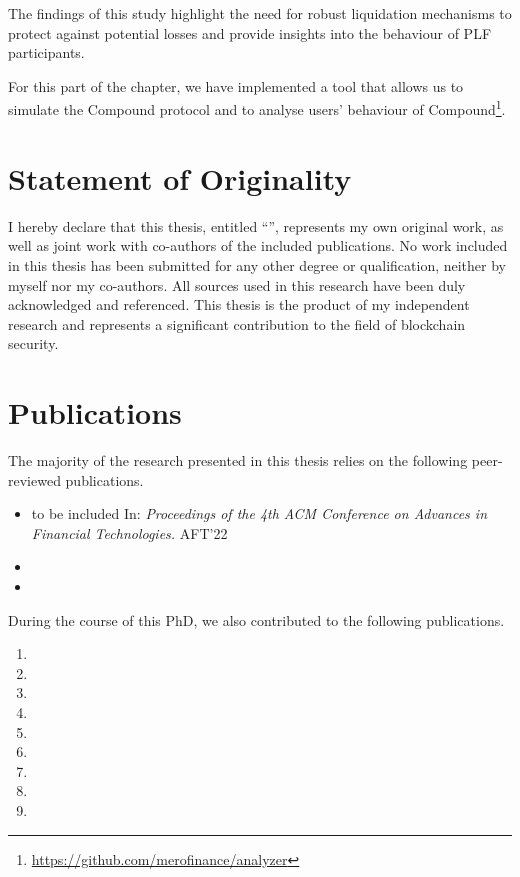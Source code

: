 The findings of this study highlight the need for robust liquidation mechanisms to protect against potential losses and provide insights into the behaviour of PLF participants.

For this part of the chapter, we have implemented a tool that allows us to simulate the Compound protocol and to analyse users' behaviour of Compound\footnote{\url{https://github.com/merofinance/analyzer}}.

\section{Statement of Originality}
I hereby declare that this thesis, entitled ``\thesistitle'', represents my own original work, as well as joint work with co-authors of the included publications.
No work included in this thesis has been submitted for any other degree or qualification, neither by myself nor my co-authors.
All sources used in this research have been duly acknowledged and referenced.
This thesis is the product of my independent research and represents a significant contribution to the field of blockchain security.

\section{Publications}

The majority of the research presented in this thesis relies on the following peer-reviewed publications.

 
 
\begin{itemize}
    \item {} to be included In: \emph{Proceedings of the 4th ACM Conference on Advances in Financial Technologies.} AFT'22
    \item {}
    \item {}
\end{itemize}

During the course of this PhD, we also contributed to the following publications.

\begin{enumerate}
    \item {}
    \item {}
    \item {}
    \item {}
    \item {}
    \item {}
    \item {}
    \item {}
    \item {}
\end{enumerate}
